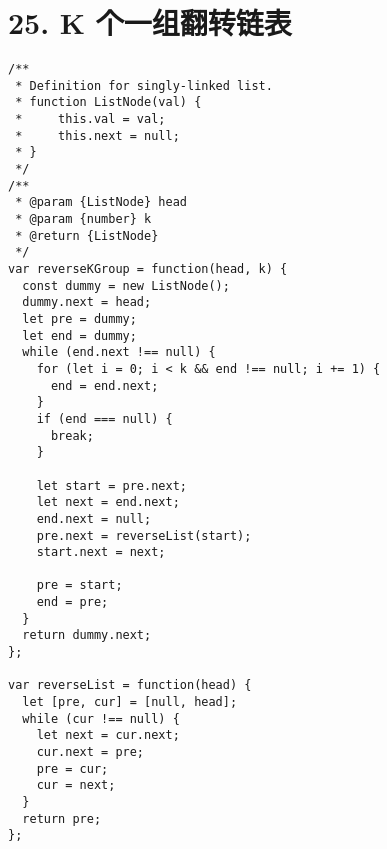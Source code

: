 \newpage
\section{25. K 个一组翻转链表}
\label{leetcode:25}

\begin{verbatim}
/**
 * Definition for singly-linked list.
 * function ListNode(val) {
 *     this.val = val;
 *     this.next = null;
 * }
 */
/**
 * @param {ListNode} head
 * @param {number} k
 * @return {ListNode}
 */
var reverseKGroup = function(head, k) {
  const dummy = new ListNode();
  dummy.next = head;
  let pre = dummy;
  let end = dummy;
  while (end.next !== null) {
    for (let i = 0; i < k && end !== null; i += 1) {
      end = end.next;
    }
    if (end === null) {
      break;
    }

    let start = pre.next;
    let next = end.next;
    end.next = null;
    pre.next = reverseList(start);
    start.next = next;

    pre = start;
    end = pre;
  }
  return dummy.next;
};

var reverseList = function(head) {
  let [pre, cur] = [null, head];
  while (cur !== null) {
    let next = cur.next;
    cur.next = pre;
    pre = cur;
    cur = next;
  }
  return pre;
};
\end{verbatim}
